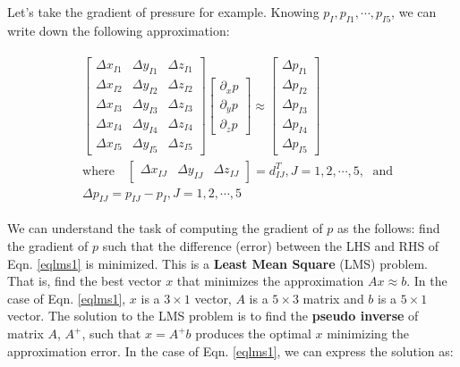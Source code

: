 \documentclass[12pt, letterpaper]{report}
\begin{document}
Let's take the gradient of pressure for example. Knowing $p_I, p_{I1}, \cdots, p_{I5}$, we can write
down the following approximation:

\begin{align}\label{eqlms1}
   \begin{split}
      &\begin{bmatrix}
         \Delta x_{I1} & \Delta y_{I1} & \Delta z_{I1} \\
         \Delta x_{I2} & \Delta y_{I2} & \Delta z_{I2} \\
         \Delta x_{I3} & \Delta y_{I3} & \Delta z_{I3} \\
         \Delta x_{I4} & \Delta y_{I4} & \Delta z_{I4} \\
         \Delta x_{I5} & \Delta y_{I5} & \Delta z_{I5}
      \end{bmatrix} \begin{bmatrix}\partial_x p \\ \partial_y p \\ \partial_z p\end{bmatrix} \approx
      \begin{bmatrix}\Delta p_{I1} \\\Delta p_{I2} \\\Delta p_{I3} \\\Delta p_{I4} \\\Delta p_{I5}
         \end{bmatrix} \\ &\textrm{where} \quad \begin{bmatrix}\Delta x_{IJ} & \Delta y_{IJ} &
      \Delta z_{IJ}\end{bmatrix} = d_{IJ}^T, J = 1,2,\cdots,5, \; \textrm{ and} \\ &\Delta p_{IJ} =
      p_{IJ} - p_I, J = 1,2,\cdots,5
   \end{split}
\end{align}

We can understand the task of computing the gradient of $p$ as the follows: find the gradient of $p$
such that the difference (error) between the LHS and RHS of Eqn. \ref{eqlms1} is minimized. This is
a {\bf Least Mean Square} (LMS) problem. That is, find the best vector $x$ that minimizes the
approximation $Ax \approx b$. In the case of Eqn. \ref{eqlms1}, $x$ is a $3\times1$ vector, $A$ is a
$5\times3$ matrix and $b$ is a $5\times1$ vector. The solution to the LMS problem is to find the
{\bf pseudo inverse} of matrix $A$, $A^+$, such that $x = A^+b$ produces the optimal $x$ minimizing
the approximation error. In the case of Eqn. \ref{eqlms1}, we can express the solution as:
\end{document}
